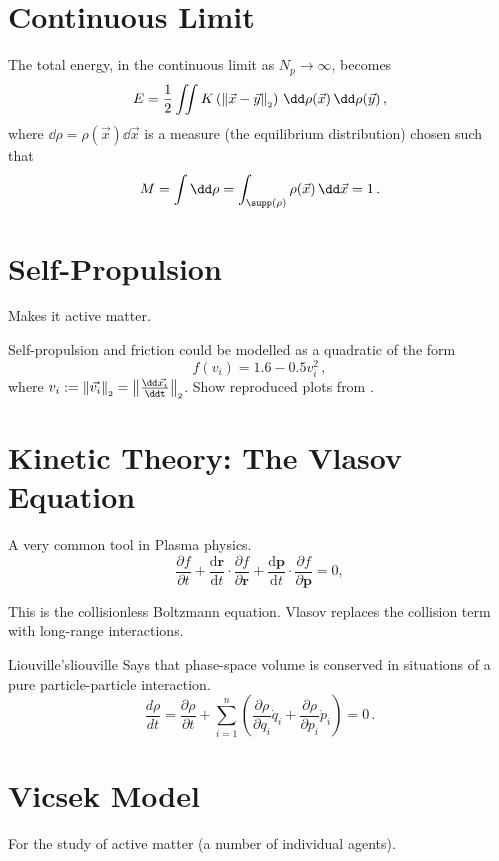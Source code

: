 \section{Continuous Limit}
The total energy, in the continuous limit as $N_p \rightarrow \infty$, becomes
$$E = \frac{1}{2} \iint K\left(\norm{\vec{x} - \vec{y}}\right) \,\dd\rho(\vec{x})\,\dd\rho(\vec{y})\,,$$
where $\dd\rho = \rho(\vec{x})\dd\vec{x}$ is a measure (the equilibrium distribution) chosen such that
$$M = \int \dd\rho = \int_{\supp(\rho)} \rho(\vec{x}) \,\dd\vec{x} = 1\,.$$

\section{Self-Propulsion}
Makes it active matter.

Self-propulsion and friction could be modelled as a quadratic of the form
$$f(v_i) = 1.6 - 0.5 v_i^2\,,$$
where $v_i := \norm{\vec{v_i}} = \norm{\frac{\dd\vec{x_i}}{\ddt}}$.
Show reproduced plots from \cite{2006-self-propelled}.


\section{Kinetic Theory: The Vlasov Equation}
A very common tool in Plasma physics.
$$\frac{\partial f}{\partial t}+{\frac {\mathrm {d} \mathbf {r} }{\mathrm {d} t}}\cdot {\frac {\partial f}{\partial \mathbf {r} }}+{\frac {\mathrm {d} \mathbf {p} }{\mathrm {d} t}}\cdot {\frac {\partial f}{\partial \mathbf {p} }}=0,$$

This is the collisionless Boltzmann equation.
Vlasov replaces the collision term with long-range interactions.

\begin{theorem}{Liouville's}{liouville}
  Says that phase-space volume is conserved in situations of a pure particle-particle interaction.
  $$\frac{d\rho}{dt}=
    \frac{\partial\rho}{\partial t}
    +\sum_{i=1}^n\left(\frac{\partial\rho}{\partial q_i}\dot{q}_i
    +\frac{\partial\rho}{\partial p_i}\dot{p}_i\right)=0\,.$$
\end{theorem}

\section{Vicsek Model}
For the study of active matter (a number of individual agents).

